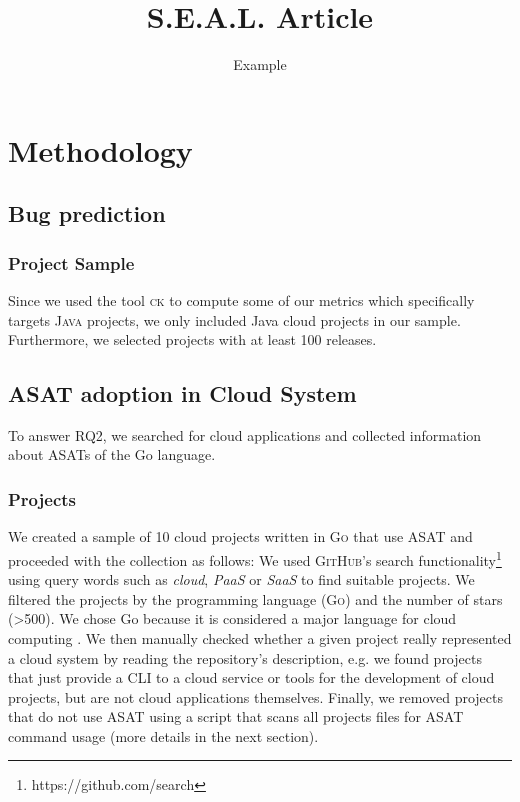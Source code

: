 \documentclass{seal_article}
\title{S.E.A.L. Article}
\subtitle{Example}
\begin{document}
\maketitle

\section{Methodology}

\subsection{Bug prediction}
\subsubsection{Project Sample}
Since we used the tool \textsc{ck} \cite{ck} to compute some of our metrics which specifically targets \textsc{Java} projects, we only included Java cloud projects in our sample. Furthermore, we selected projects with at least 100 releases.

\subsection{ASAT adoption in Cloud System}
To answer RQ2, we searched for cloud applications and collected information about ASATs of the Go language. 

\subsubsection{Projects}
We created a sample of 10 cloud projects written in \textsc{Go} that use ASAT and proceeded with the collection as follows: We used \textsc{GitHub}'s search functionality\footnote{https://github.com/search} using query words such as \textit{cloud}, \textit{PaaS} or \textit{SaaS} to find suitable projects. We filtered the projects by the programming language (\textsc{Go}) and the number of stars (>500). We chose Go because it is considered a major language for cloud computing \cite{thenewstack}. We then manually checked whether a given project really represented a cloud system by reading the repository's description, e.g. we found projects that just provide a CLI to a cloud service or tools for the development of cloud projects, but are not cloud applications themselves. Finally, we removed projects that do not use ASAT using a script that scans all projects files for ASAT command usage (more details in the next section).
\end{document}
